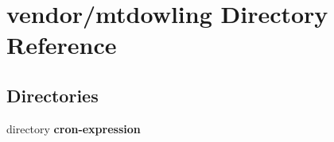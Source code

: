 \section{vendor/mtdowling Directory Reference}
\label{dir_63fb62f8f880ef16ba8d5952c89bb4b1}
\subsection*{Directories}
\begin{DoxyCompactItemize}
\item 
directory {\bf cron-\/expression}
\end{DoxyCompactItemize}
